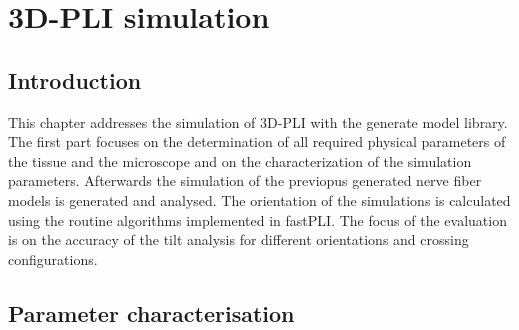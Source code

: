 \cleardoublepage
\setcounter{chapter}{8}
\chapter{3D-PLI simulation}
\label{cha:simulation_analysis}
%
%
\section{Introduction}
%
This chapter addresses the simulation of \ac{3D-PLI} with the generate model library.
The first part focuses on the determination of all required physical parameters of the tissue and the microscope and on the characterization of the simulation parameters.
Afterwards the simulation of the previopus generated nerve fiber models is generated and analysed.
The orientation of the simulations is calculated using the routine algorithms implemented in \ac{fastPLI}.
The focus of the evaluation is on the accuracy of the tilt analysis for different orientations and crossing configurations.
%
%
%
\section{Parameter characterisation}\label{sec:sim_choose_parameters}
%
